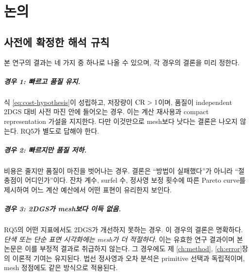 \chapter{논의}
\label{ch:discussion}

\ifdraftmode
\begin{center}
\end{center}
\medskip
\fi

\section{사전에 확정한 해석 규칙}
\label{sec:interpretation-rules}

본 연구의 결과는 네 가지 중 하나로 나올 수 있으며, 각 경우의 결론을 미리 정한다.

\paragraph{경우 1: 빠르고 품질 유지.}
식 \eqref{eq:cost-hypothesis}이 성립하고, 저장량이 $\mathrm{CR}>1$이며, 품질이 independent
2DGS 대비 사전 마진 안에 들어오는 경우. 이는 계산 재사용과 compact representation
가설을 지지한다. 다만 이것만으로 mesh보다 낫다는 결론은 나오지 않는다. RQ5가 별도로
답해야 한다.

\paragraph{경우 2: 빠르지만 품질 저하.}
비용은 줄지만 품질이 마진을 벗어나는 경우. 결론은 ``방법이 실패했다''가 아니라
``절충점이 어디인가''이다. 잔차 계수, surfel 수, 정사영 보정 횟수에 따른 Pareto
curve를 제시하여 어느 계산 예산에서 어떤 표현이 유리한지 보인다.

\paragraph{경우 3: 2DGS가 mesh보다 이득 없음.}
RQ5의 어떤 지표에서도 2DGS가 개선하지 못하는 경우. 이 경우의 결론은 명확하다.
\emph{단색 또는 단순 표면 시각화에는 mesh가 더 적절하다}. 이는 유효한 연구 결과이며
본 논문은 이를 부정적 결과로 취급하지 않는다. 그 경우에도 제 \ref{ch:method},
\ref{ch:error}장의 이론적 기여는 유지된다. 법선 정사영과 오차 분석은 primitive 선택과
독립적이며, mesh 정점에도 같은 방식으로 적용된다.

